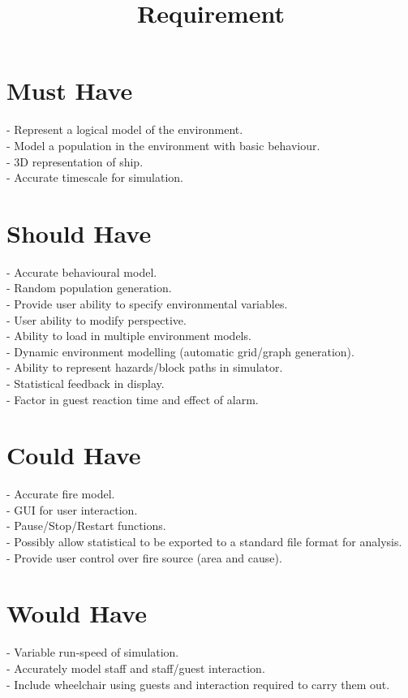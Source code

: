 \documentclass{article}
\title{Requirement}
\date{}
\begin{document}
\maketitle

\section{Must Have}
 - Represent a logical model of the environment.\\
 - Model a population in the environment with basic behaviour.\\
 - 3D representation of ship.\\
 - Accurate timescale for simulation.
 
\section{Should Have}
 - Accurate behavioural model.\\
 - Random population generation.\\
 - Provide user ability to specify environmental variables.\\
 - User ability to modify perspective.\\
 - Ability to load in multiple environment models.\\
 - Dynamic environment modelling (automatic grid/graph generation).\\
 - Ability to represent hazards/block paths in simulator.\\
 - Statistical feedback in display.\\
 - Factor in guest reaction time and effect of alarm.

\section{Could Have}
 - Accurate fire model.\\
 - GUI for user interaction.\\
 - Pause/Stop/Restart functions.\\
 - Possibly allow statistical to be exported to a standard file format for analysis.\\
 - Provide user control over fire source (area and cause).

\section{Would Have}
 - Variable run-speed of simulation.\\
 - Accurately model staff and staff/guest interaction.\\
 - Include wheelchair using guests and interaction required to carry them out.
\end{document}
